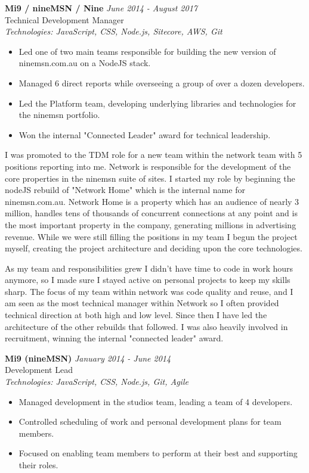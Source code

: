 \documentclass[a4paper,10pt]{article}
\begin{document}
\textbf{Mi9 / nineMSN / Nine} \hfill \textit{June 2014 - August 2017} \\
Technical Development Manager \\
\textit{Technologies: JavaScript, CSS, Node.js, Sitecore, AWS, Git}
\begin{itemize}
    \item Led one of two main teams responsible for building the new version of ninemsn.com.au on a NodeJS stack.
    \item Managed 6 direct reports while overseeing a group of over a dozen developers.
    \item Led the Platform team, developing underlying libraries and technologies for the ninemsn portfolio.
    \item Won the internal "Connected Leader" award for technical leadership.
\end{itemize}

I was promoted to the TDM role for a new team within the network team with 5 positions reporting into me. Network is responsible for the development of the core properties in the ninemsn suite of sites. I started my role by beginning the nodeJS rebuild of "Network Home" which is the internal name for ninemsn.com.au. Network Home is a property which has an audience of nearly 3 million, handles tens of thousands of concurrent connections at any point and is the most important property in the company, generating millions in advertising revenue. While we were still filling the positions in my team I begun the project myself, creating the project architecture and deciding upon the core technologies.

As my team and responsibilities grew I didn't have time to code in work hours anymore, so I made sure I stayed active on personal projects to keep my skills sharp. The focus of my team within network was code quality and reuse, and I am seen as the most technical manager within Network so I often provided technical direction at both high and low level. Since then I have led the architecture of the other rebuilds that followed. I was also heavily involved in recruitment, winning the internal "connected leader" award.

\vspace{1em}

\textbf{Mi9 (nineMSN)} \hfill \textit{January 2014 - June 2014} \\
Development Lead \\
\textit{Technologies: JavaScript, CSS, Node.js, Git, Agile}
\begin{itemize}
    \item Managed development in the studios team, leading a team of 4 developers.
    \item Controlled scheduling of work and personal development plans for team members.
    \item Focused on enabling team members to perform at their best and supporting their roles.
\end{itemize}
\end{document}
